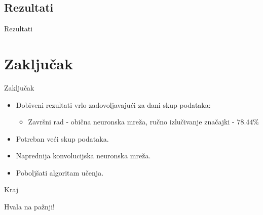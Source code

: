 \documentclass{beamer}
\begin{document}
\subsection{Rezultati}
\begin{frame}{Rezultati}
\begin{figure}
\centering
{}
\end{figure} 
\end{frame}

\section*{Zaključak}

\begin{frame}{Zaključak}
  \begin{itemize}
    \item Dobiveni rezultati vrlo zadovoljavajući za dani skup podataka:
     \begin{itemize}
         \item Završni rad - obična neuronska mreža, ručno izlučivanje značajki - $78.44\%$
     \end{itemize}
    \item Potreban veći skup podataka.
    \item Naprednija konvolucijska neuronska mreža.
    \item Poboljšati algoritam učenja.
  \end{itemize}
\end{frame}

\begin{frame}{Kraj}
    \begin{center}
        {\Huge Hvala na pažnji!}
    \end{center}
\end{frame}
\end{document}
